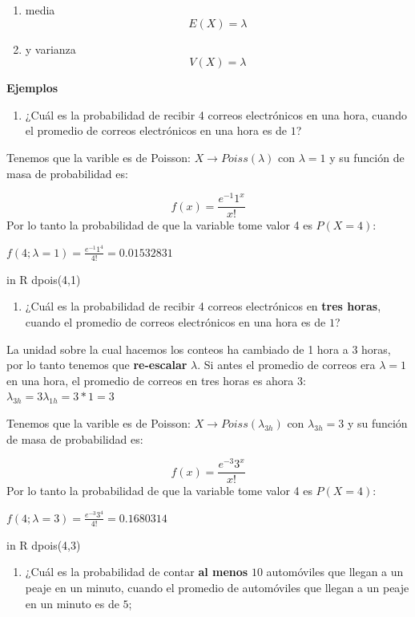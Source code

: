 \documentclass[
]{book}
\providecommand{\tightlist}{%
  \setlength{\itemsep}{0pt}\setlength{\parskip}{0pt}}
\begin{document}
\begin{enumerate}
\def\labelenumi{\arabic{enumi})}
\tightlist
\item
  media \[E(X)= \lambda\]
\item
  y varianza \[V(X)= \lambda\]
\end{enumerate}

\textbf{Ejemplos}

\begin{enumerate}
\def\labelenumi{\arabic{enumi})}
\tightlist
\item
  ¿Cuál es la probabilidad de recibir 4 correos electrónicos en una hora, cuando el promedio de correos electrónicos en una hora es de \(1\)?
\end{enumerate}

Tenemos que la varible es de Poisson: \(X \rightarrow Poiss(\lambda)\) con \(\lambda=1\) y su función de masa de probabilidad es:

\[f(x)= \frac{e^{-1}1^x}{x!}\]
Por lo tanto la probabilidad de que la variable tome valor 4 es \(P(X=4)\):

\(f(4; \lambda=1)= \frac{e^{-1}1^4}{4!}=0.01532831\)

in R dpois(4,1)

\begin{enumerate}
\def\labelenumi{\arabic{enumi})}
\setcounter{enumi}{1}
\tightlist
\item
  ¿Cuál es la probabilidad de recibir 4 correos electrónicos en \textbf{tres horas}, cuando el promedio de correos electrónicos en una hora es de \(1\)?
\end{enumerate}

La unidad sobre la cual hacemos los conteos ha cambiado de 1 hora a 3 horas, por lo tanto tenemos que \textbf{re-escalar} \(\lambda\). Si antes el promedio de correos era \(\lambda=1\) en una hora, el promedio de correos en tres horas es ahora 3: \(\lambda_{3h}=3\lambda_{1h}=3*1=3\)

Tenemos que la varible es de Poisson: \(X \rightarrow Poiss(\lambda_{3h})\) con \(\lambda_{3h}=3\) y su función de masa de probabilidad es:

\[f(x)= \frac{e^{-3}3^x}{x!}\]
Por lo tanto la probabilidad de que la variable tome valor 4 es \(P(X=4)\):

\(f(4; \lambda=3)= \frac{e^{-3}3^4}{4!}=0.1680314\)

in R dpois(4,3)

\begin{enumerate}
\def\labelenumi{\arabic{enumi})}
\setcounter{enumi}{2}
\tightlist
\item
  ¿Cuál es la probabilidad de contar \textbf{al menos} \(10\) automóviles que llegan a un peaje en un minuto, cuando el promedio de automóviles que llegan a un peaje en un minuto es de \(5\);
\end{enumerate}
\end{document}
